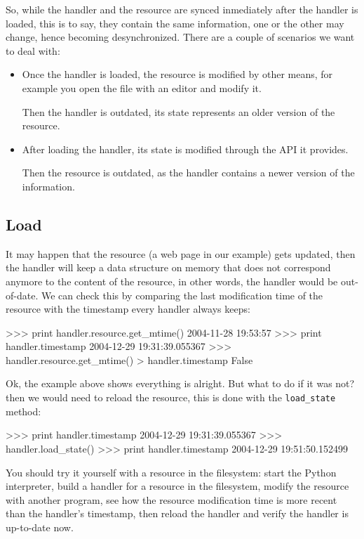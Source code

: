 So, while the handler and the resource are synced inmediately after the
handler is loaded, this is to say, they contain the same information,
one or the other may change, hence becoming desynchronized. There are a
couple of scenarios we want to deal with:

\begin{itemize}
  \item Once the handler is loaded, the resource is modified by other
    means, for example you open the file with an editor and modify it.

    Then the handler is outdated, its state represents an older version
    of the resource.

  \item After loading the handler, its state is modified through the API
    it provides.

    Then the resource is outdated, as the handler contains a newer version
    of the information.
\end{itemize}



\subsection{Load}

It may happen that the resource (a web page in our example) gets updated, then
the handler will keep a data structure on memory that does not correspond
anymore to the content of the resource, in other words, the handler would
be out-of-date. We can check this by comparing the last modification time of
the resource with the timestamp every handler always keeps:

\begin{code}
    >>> print handler.resource.get_mtime()
    2004-11-28 19:53:57
    >>> print handler.timestamp
    2004-12-29 19:31:39.055367
    >>> handler.resource.get_mtime() > handler.timestamp
    False
\end{code}

Ok, the example above shows everything is alright. But what to do if it was
not? then we would need to reload the resource, this is done with the
{\tt load\_state} method:

\begin{code}
    >>> print handler.timestamp
    2004-12-29 19:31:39.055367
    >>> handler.load_state()
    >>> print handler.timestamp
    2004-12-29 19:51:50.152499
\end{code}

You should try it yourself with a resource in the filesystem: start the
Python interpreter, build a handler for a resource in the filesystem,
modify the resource with another program, see how the resource
modification time is more recent than the handler's timestamp, then reload
the handler and verify the handler is up-to-date now.

